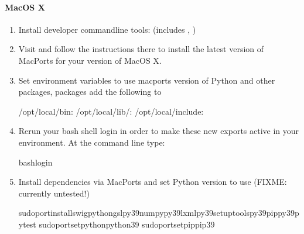 \documentclass[letterpaper,10pt,english,openany,oneside]{sphinxmanual}
\begin{document}
\paragraph{MacOS X}
\label{\detokenize{docs/guide-chapter-contributing:macos-x}}\begin{enumerate}
%
\item {} 
\sphinxAtStartPar
Install developer command\sphinxhyphen{}line tools:
 (includes , )

\item {} 
\sphinxAtStartPar
Visit  and follow the instructions there to
install the latest version of MacPorts for your version of MacOS X.

\item {} 
\sphinxAtStartPar
Set environment variables to use macports version of Python and other
packages, packages add the following to 

\begin{sphinxVerbatim}[commandchars=\\\{\}]
/opt/local/bin:
/opt/local/lib/:
/opt/local/include:
\end{sphinxVerbatim}

\item {} 
\sphinxAtStartPar
Rerun your bash shell login in order to make these new exports active
in your environment. At the command line type:

\begin{sphinxVerbatim}[commandchars=\\\{\}]
bash\PYGZhy{}login
\end{sphinxVerbatim}

\item {} 
\sphinxAtStartPar
Install dependencies via MacPorts and set Python version to use
(FIXME: currently untested!)

\begin{sphinxVerbatim}[commandchars=\\\{\}]
sudoportinstallswig\PYGZhy{}pythongslpy39\PYGZhy{}numpypy39\PYGZhy{}lxmlpy39\PYGZhy{}setuptoolspy39\PYGZhy{}pippy39\PYGZhy{}pytest
sudoport\PYGZhy{}\PYGZhy{}setpythonpython39
sudoport\PYGZhy{}\PYGZhy{}setpippip39
\end{sphinxVerbatim}


\end{enumerate}
\end{document}
